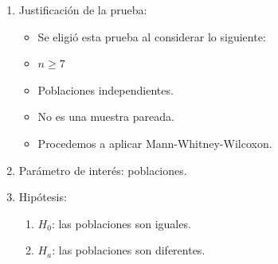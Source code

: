 \begin{enumerate}
    \item Justificación de la prueba:
        \begin{itemize}
            \item Se eligió esta prueba al considerar lo siguiente: 
            \item $n \geq 7$ 
            \item Poblaciones independientes.
            \item No es una muestra pareada.
            \item Procedemos a aplicar Mann-Whitney-Wilcoxon.
        \end{itemize}
    \item Parámetro de interés: poblaciones.
    \item Hipótesis: 
        \begin{enumerate}
            \item $H_0$: las poblaciones son iguales.
            \item $H_a$: las poblaciones son diferentes.
        \end{enumerate}
    

\end{enumerate}
